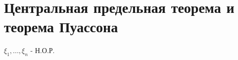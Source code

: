 \section{Центральная предельная теорема и теорема Пуассона}
\begin{theorem}[ЦПТ]
 $\xi_1, ..., \xi_n$ - Н.О.Р.
\end{theorem}

